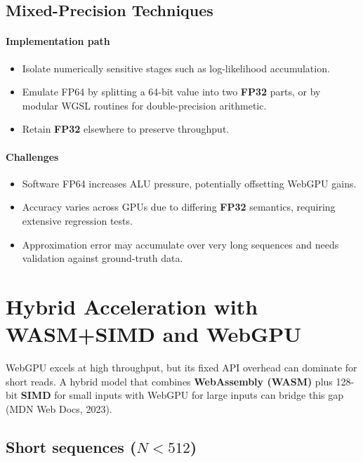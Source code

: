 \documentclass[PhD]{PHlab-thesis}
\begin{document}
\subsection*{Mixed-Precision Techniques}

\paragraph{Implementation path}
\begin{itemize}
  \item Isolate numerically sensitive stages such as log-likelihood accumulation.
  \item Emulate FP64 by splitting a 64-bit value into two \textbf{FP32} parts, or by modular WGSL routines for double-precision arithmetic.
  \item Retain \textbf{FP32} elsewhere to preserve throughput.
\end{itemize}

\paragraph{Challenges}
\begin{itemize}
  \item Software FP64 increases ALU pressure, potentially offsetting WebGPU gains.
  \item Accuracy varies across GPUs due to differing \textbf{FP32} semantics, requiring extensive regression tests.
  \item Approximation error may accumulate over very long sequences and needs validation against ground-truth data.
\end{itemize}

\section{Hybrid Acceleration with WASM+SIMD and WebGPU}

WebGPU excels at high throughput, but its fixed API overhead can dominate for short reads. A hybrid model that combines \textbf{WebAssembly (WASM)} plus 128-bit \textbf{SIMD} for small inputs with WebGPU for large inputs can bridge this gap (MDN Web Docs, 2023).

\subsection{Short sequences ($N < 512$)}
\end{document}
